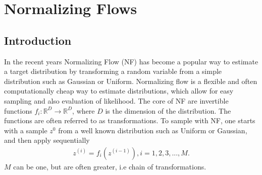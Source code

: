 \chapter{Normalizing Flows}
\section{Introduction}
In the recent years Normalizing Flow (NF) has become a popular way to estimate
a target distribution by transforming a random variable from a simple distribution 
such as Gaussian or Uniform.
Normalizing flow is a flexible and often computationally cheap way
to estimate distributions, which allow for easy sampling and also evaluation of
likelihood. The core of NF are invertible functions \(f_i: \mathbb{R}^D \rightarrow 
\mathbb{R}^D\), where \(D\) is the dimension of the distribution. The functions are often 
referred to as transformations. 
To sample with NF, one starts with a sample \(z^0\) from a well 
known distribution such as Uniform or Gaussian, and then apply sequentially 
\begin{align}
z^{(i)} = f_i(z^{(i-1)}), i=1,2,3,...,M.
\end{align}
\(M\) can be one, but are often greater, i.e chain of transformations.\\
